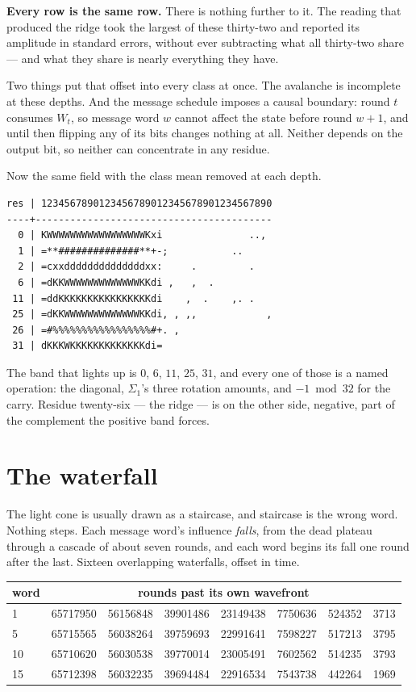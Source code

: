 \textbf{Every row is the same row.} There is nothing further to it. The reading that produced the ridge
took the largest of these thirty-two and reported its amplitude in standard errors, without ever
subtracting what all thirty-two share --- and what they share is nearly everything they have.

Two things put that offset into every class at once. The avalanche is incomplete at these depths.
And the message schedule imposes a causal boundary: round \(t\) consumes \(W_t\), so message word
\(w\) cannot affect the state before round \(w+1\), and until then flipping any of its bits changes
nothing at all. Neither depends on the output bit, so neither can concentrate in any residue.

Now the same field with the class mean removed at each depth.

\begin{verbatim}
res | 1234567890123456789012345678901234567890
----+-----------------------------------------
  0 | KWWWWWWWWWWWWWWWWWKxi               ..,
  1 | =**##############**+-;           ..
  2 | =cxxddddddddddddddxx:     .         .
  6 | =dKKWWWWWWWWWWWWWKKdi ,   ,  .
 11 | =ddKKKKKKKKKKKKKKKKdi    ,  .    ,. .
 25 | =dKKWWWWWWWWWWWWWKKdi, , ,,            ,
 26 | =#%%%%%%%%%%%%%%%%%#+. ,
 31 | dKKKWKKKKKKKKKKKKKdi=
\end{verbatim}

The band that lights up is \(0\), \(6\), \(11\), \(25\), \(31\), and every one of those is a named
operation: the diagonal, \(\Sigma_1\)'s three rotation amounts, and \(-1 \bmod 32\) for the
carry. Residue twenty-six --- the ridge --- is on the other side, negative, part of the complement
the positive band forces.

\section{The waterfall}

The light cone is usually drawn as a staircase, and staircase is the wrong word. Nothing steps. Each
message word's influence \emph{falls}, from the dead plateau through a cascade of about seven
rounds, and each word begins its fall one round after the last. Sixteen overlapping waterfalls,
offset in time.

\begin{center}
\begin{tabular}{lrrrrrrr}
\toprule
word & \multicolumn{7}{c}{rounds past its own wavefront} \\
\midrule
1 & 65717950 & 56156848 & 39901486 & 23149438 & 7750636 & 524352 & 3713 \\
5 & 65715565 & 56038264 & 39759693 & 22991641 & 7598227 & 517213 & 3795 \\
10 & 65710620 & 56030538 & 39770014 & 23005491 & 7602562 & 514235 & 3793 \\
15 & 65712398 & 56032235 & 39694484 & 22916534 & 7543738 & 442264 & 1969 \\
\bottomrule
\end{tabular}
\end{center}

